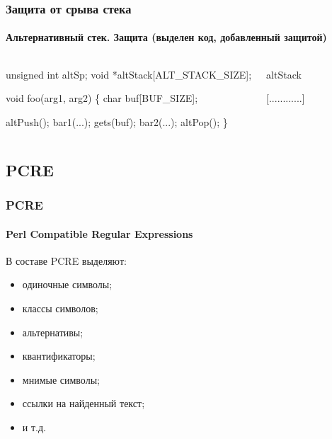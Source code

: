 \begin{frame}[fragile]
    \frametitle{Защита от срыва стека}
    \framesubtitle{Альтернативный стек. Защита (\alert{выделен} код, добавленный защитой)}

\begin{columns}
\begin{semiverbatim}
\alert{unsigned int altSp};
\alert{void *altStack[ALT_STACK_SIZE]};

void foo(arg1, arg2) \{
    char buf[BUF_SIZE];
    
\alert{    \only<2>{->}altPush()};
    bar1(...);
    gets(buf);
    bar2(...);
\alert{    altPop()};
\}
\end{semiverbatim}
        \begin{block}{altStack}
\begin{semiverbatim}
[............]
\end{semiverbatim}
        \end{block}
        \begin{block}{}
\begin{semiverbatim}
[buf        ...]
\end{semiverbatim}
        \end{block}
\end{columns}
\end{frame}


\subsection{PCRE}

\begin{frame}
    \frametitle{PCRE}
    \framesubtitle{Perl Compatible Regular Expressions}
    
    В составе PCRE выделяют:
    \begin{itemize}
        \item одиночные символы; 
        \item классы символов; 
        \item альтернативы; 
        \item квантификаторы; 
        \item мнимые символы; 
        \item ссылки на найденный текст;
        \item и т.д.
    \end{itemize}
\end{frame}

